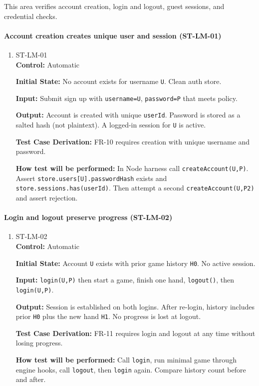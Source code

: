 \documentclass[12pt, titlepage]{article}
\begin{document}
This area verifies account creation, login and logout, guest sessions, and credential checks.

\paragraph{Account creation creates unique user and session (ST-LM-01)}
\begin{enumerate}
\item{ST-LM-01\\}
\textbf{Control:} Automatic

\textbf{Initial State:} No account exists for username \texttt{U}. Clean auth store.

\textbf{Input:} Submit sign up with \texttt{username=U}, \texttt{password=P} that meets policy.

\textbf{Output:} Account is created with unique \texttt{userId}. Password is stored as a salted hash (not plaintext). A logged-in session for \texttt{U} is active.

\textbf{Test Case Derivation:} FR-10 requires creation with unique username and password.

\textbf{How test will be performed:} In Node harness call \texttt{createAccount(U,P)}. Assert \texttt{store.users[U].passwordHash} exists and \texttt{store.sessions.has(userId)}. Then attempt a second \texttt{createAccount(U,P2)} and assert rejection.
\end{enumerate}

\paragraph{Login and logout preserve progress (ST-LM-02)}
\begin{enumerate}
\item{ST-LM-02\\}
\textbf{Control:} Automatic

\textbf{Initial State:} Account \texttt{U} exists with prior game history \texttt{H0}. No active session.

\textbf{Input:} \texttt{login(U,P)} then start a game, finish one hand, \texttt{logout()}, then \texttt{login(U,P)}.

\textbf{Output:} Session is established on both logins. After re-login, history includes prior \texttt{H0} plus the new hand \texttt{H1}. No progress is lost at logout.

\textbf{Test Case Derivation:} FR-11 requires login and logout at any time without losing progress.

\textbf{How test will be performed:} Call \texttt{login}, run minimal game through engine hooks, call \texttt{logout}, then \texttt{login} again. Compare history count before and after.
\end{enumerate}
\end{document}
